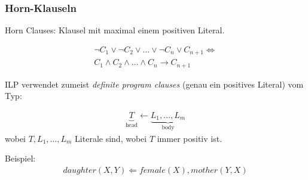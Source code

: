 \begin{frame}
	\frametitle{Horn-Klauseln}
	Horn Clauses: Klausel mit maximal einem positiven Literal.

	\begin{align*}
		\neg C_1 \lor \neg C_2 \lor \ldots \lor \neg C_n  \lor C_{n+1} \Leftrightarrow\\
		C_1 \land C_2 \land \ldots \land C_n  \rightarrow C_{n+1}
	\end{align*}

	ILP verwendet zumeist \textit{definite program clauses } (genau ein positives Literal) vom Typ:

	\begin{align*}
		\underbrace{T}_{\text{head}} \leftarrow \underbrace{L_1, \ldots, L_m}_{\text{body}}
	\end{align*}
	wobei $T, L_1, \ldots, L_m$ Literale sind, wobei $T$ immer positiv ist.

	Beispiel:
	\begin{align*}
		daughter(X,Y) \Leftarrow female(X), mother(Y, X)
	\end{align*}
\end{frame}

